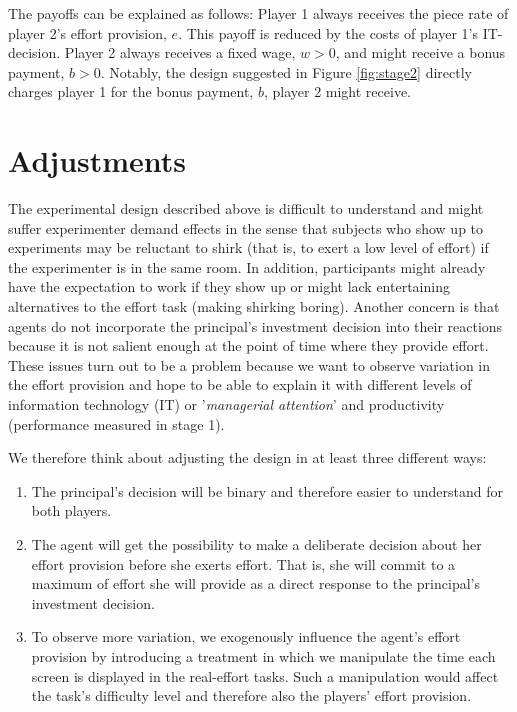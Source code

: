 The payoffs can be explained as follows: Player 1 always receives the piece rate of player 2's effort provision, $e$. This payoff is reduced by the costs of player 1's IT-decision. Player 2 always receives a fixed wage, $w>0$, and might receive a bonus payment, $b>0$. Notably, the design suggested in Figure \ref{fig:stage2} directly charges player 1 for the bonus payment, $b$, player 2 might receive.




\section{Adjustments}
The experimental design described above is difficult to understand and might suffer experimenter demand effects in the sense that subjects who show up to experiments may be reluctant to shirk (that is, to exert a low level of effort) if the experimenter is in the same room. In addition, participants might already have the expectation to work if they show up or might lack entertaining alternatives to the effort task (making shirking boring). Another concern is that agents do not incorporate the principal's investment decision into their reactions because it is not salient enough at the point of time where they provide effort. These issues turn out to be a problem because we want to observe variation in the effort provision and hope to be able to explain it with different levels of information technology (IT) or '\emph{managerial attention}' and productivity (performance measured in stage 1). 

We therefore think about adjusting the design in at least three different ways:
\begin{enumerate}
      \item The principal's decision will be binary and therefore easier to understand for both players.
      \item The agent will get the possibility to make a deliberate decision about her effort provision 
      before she exerts effort. That is, she will commit to a maximum of effort she will provide as a direct 
      response to the principal's investment decision.
      \item To observe more variation, we exogenously influence the agent's effort provision by 
      introducing a treatment in which we manipulate the time each screen is displayed in the real-effort 
      tasks. Such a manipulation would affect the task's difficulty level and therefore also the players' 
      effort provision. 
\end{enumerate}


